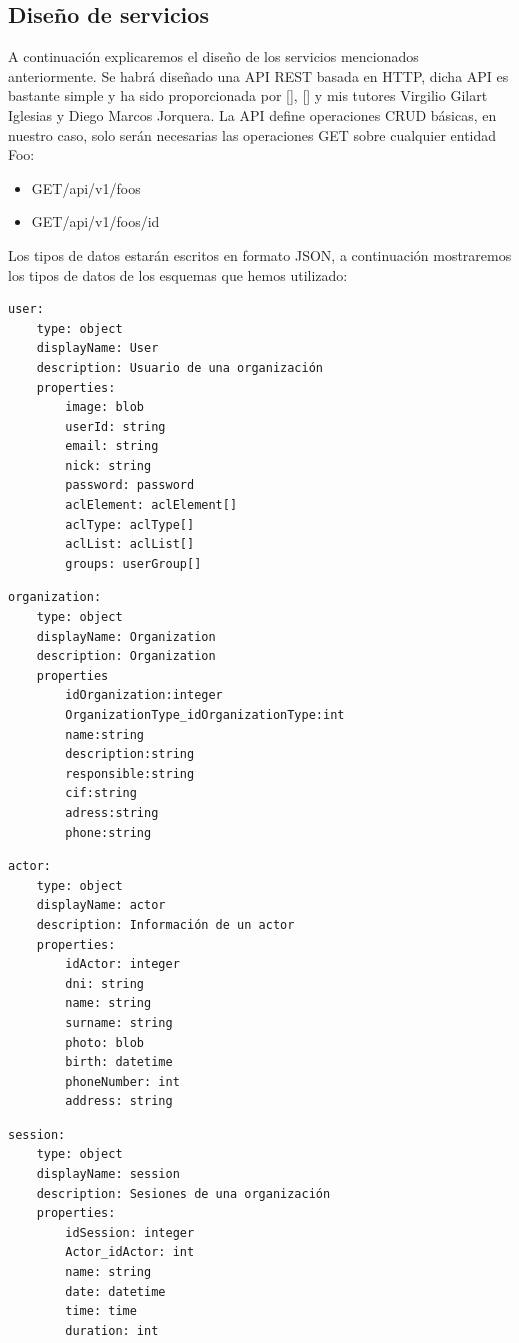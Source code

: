 \subsection{Diseño de servicios}
A continuación explicaremos el diseño de los servicios mencionados anteriormente. Se habrá diseñado una API REST basada en HTTP, dicha API es bastante simple y ha sido proporcionada por [\cite{TFG_Daniel}], [\cite{TFG_Sergio}] y mis tutores Virgilio Gilart Iglesias y Diego Marcos Jorquera.
La API define operaciones CRUD básicas, en nuestro caso, solo serán necesarias las operaciones GET sobre cualquier entidad Foo:
\begin{itemize}
\item GET/api/v1/foos
\item GET/api/v1/foos/id
\end{itemize}
Los tipos de datos estarán escritos en formato JSON, a continuación mostraremos los tipos de datos de los esquemas que hemos utilizado:
\begin{lstlisting}[style=Consola, caption={Tipo dato user},label=Consola_code_user]
user: 
	type: object 
   	displayName: User 
   	description: Usuario de una organización 
   	properties: 
     	image: blob 
     	userId: string 
     	email: string 
    	nick: string 
     	password: password 
     	aclElement: aclElement[] 
     	aclType: aclType[] 
     	aclList: aclList[] 
     	groups: userGroup[] 
\end{lstlisting}
\begin{lstlisting}[style=Consola, caption={Tipo dato organización},label=Consola_code_org]
organization:
	type: object
 	displayName: Organization
 	description: Organization
 	properties
 		idOrganization:integer
		OrganizationType_idOrganizationType:int
		name:string
		description:string
		responsible:string
		cif:string
		adress:string
		phone:string
\end{lstlisting}
\begin{lstlisting}[style=Consola, caption={Tipo dato actor},label=Consola_code_actor]
actor: 
	type: object 
	displayName: actor 
	description: Información de un actor 
	properties: 
		idActor: integer 
		dni: string 
		name: string 
		surname: string 
		photo: blob 
		birth: datetime 
		phoneNumber: int 
		address: string
\end{lstlisting}
\begin{lstlisting}[style=Consola, caption={Tipo dato sesión},label=Consola_code_sesion]
session: 
   	type: object 
    displayName: session
    description: Sesiones de una organización 
    properties: 
    	idSession: integer 
      	Actor_idActor: int 
      	name: string 
      	date: datetime 
      	time: time 
      	duration: int
\end{lstlisting}
